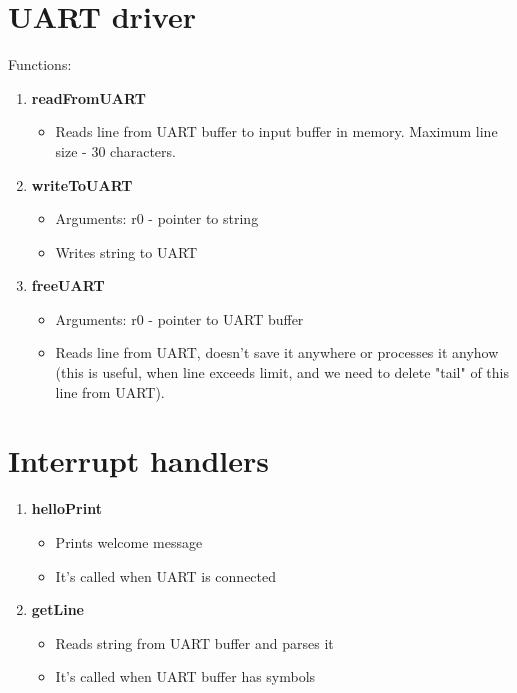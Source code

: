 \section*{UART driver}

Functions:

\begin{enumerate}
	\item \textbf{readFromUART}
		\begin{itemize}
			\item Reads line from UART buffer to input buffer in memory. Maximum line size - 30 characters.
		\end{itemize}
	\item \textbf{writeToUART}
		\begin{itemize}
			\item Arguments: r0 - pointer to string
			\item Writes string to UART
		\end{itemize}
	\item \textbf{freeUART}
		\begin{itemize}
			\item Arguments: r0 - pointer to UART buffer
			\item Reads line from UART, doesn't save it anywhere or processes it anyhow (this is useful, when line exceeds limit, and we need to delete "tail" of this line from UART).
		\end{itemize}
\end{enumerate}

\section*{Interrupt handlers}

\begin{enumerate}
	\item \textbf{helloPrint}
		\begin{itemize}
			\item Prints welcome message
			\item It's called when UART is connected
		\end{itemize}
	\item \textbf{getLine}
		\begin{itemize}
			\item Reads string from UART buffer and parses it
			\item It's called when UART buffer has symbols
		\end{itemize}
\end{enumerate}

